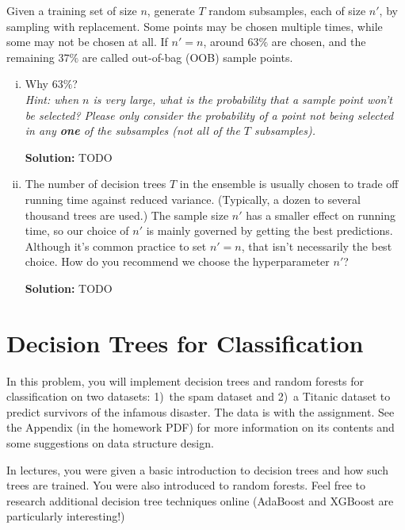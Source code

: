 \documentclass{article}
\newcommand{\Question}[1]{\Large \section{ #1 } \normalsize}
\newenvironment{solution}{\color{blue} \smallskip \textbf{Solution:}}{}
\begin{document}
\begin{enumerate}[(a)]
    Given a training set of size $n$, generate $T$ random subsamples, each of size $n'$, by sampling with replacement. 
    Some points may be chosen multiple times, while some may not be chosen at all. 
    If $n' = n$, around $63\%$ are chosen, and the remaining $37\%$ are called out-of-bag (OOB) sample points.
    \begin{enumerate}[(i)]
    	\item Why $63\%$? \\
    	\textit{Hint: when $n$ is very large, what is the probability that a sample point won't be selected? Please only consider the probability of a point not being selected in any \textbf{one} of the subsamples (not all of the $T$ subsamples).}
    	
    	\begin{solution}
    	   TODO
    	\end{solution}
     
    	\item 
        The number of decision trees $T$ in the ensemble is usually chosen to trade off running time against reduced variance. 
        (Typically, a dozen to several thousand trees are used.) 
        The sample size $n'$ has a smaller effect on running time, so our choice of $n'$ is mainly governed by getting the best predictions. 
        Although it's common practice to set $n' = n$, that isn't necessarily the best choice. 
        How do you recommend we choose the hyperparameter $n'$?
    	
    	\begin{solution}
            TODO
    	\end{solution}
    \end{enumerate}
\end{enumerate}


\newpage
\Question{Decision Trees for Classification}
In this problem, you will implement decision trees and random forests for classification on two datasets: 1)~the spam dataset and 2)~a Titanic dataset to predict survivors of the infamous disaster. 
The data is with the assignment. 
See the Appendix (in the homework PDF) for more information on its contents and some suggestions on data structure design.

In lectures, you were given a basic introduction to decision trees and how such trees are trained. 
You were also introduced to random forests. 
Feel free to research additional decision tree techniques online (AdaBoost and XGBoost are particularly interesting!)
\end{document}
